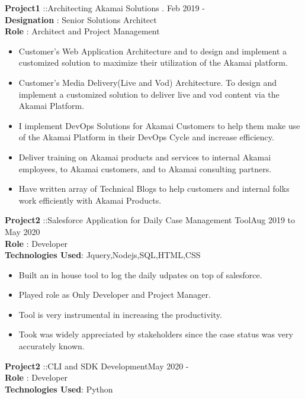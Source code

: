 \documentclass{resumeclass}
\begin{document}
\begin{resume}
  
  \textbf{Project1} ::Architecting Akamai Solutions . \hfill      Feb 2019 - \\
  \textbf{Designation} : Senior Solutions Architect \\
  \textbf{Role} : Architect and Project Management 

   \begin{itemize} \itemsep -2pt
    \item Customer’s Web Application Architecture and to design and implement a customized solution to maximize their utilization of the Akamai platform.
    \item Customer’s Media Delivery(Live and Vod) Architecture. To design and implement a customized solution to deliver live and vod content via the Akamai Platform.
    \item I implement DevOps Solutions for Akamai Customers to help them make use of the Akamai Platform in their DevOps Cycle and increase efficiency.
    \item Deliver training on Akamai products and services to internal Akamai employees, to Akamai customers, and to Akamai consulting partners.
    \item Have written array of Technical Blogs to help customers and internal folks work efficiently with Akamai Products.
  \end{itemize} \vspace{-6pt}
  
  
  \textbf{Project2} ::Salesforce Application for Daily Case Management Tool\hfill      Aug 2019 to May 2020 \\
  \textbf{Role} : Developer \\
  \textbf{Technologies Used}: Jquery,Nodejs,SQL,HTML,CSS
  
   \begin{itemize} \itemsep -2pt
    \item Built an in house tool to log the daily udpates on top of salesforce. 
    \item Played role as Only Developer and Project Manager. 
    \item Tool is very instrumental in increasing the productivity.
    \item Took was widely appreciated by stakeholders since the case status was very accurately known.
  \end{itemize} \vspace{-6pt}

  \textbf{Project2} ::CLI and SDK Development\hfill      May 2020 - \\
  \textbf{Role} : Developer \\
  \textbf{Technologies Used}: Python
  

\end{resume}
\end{document}
